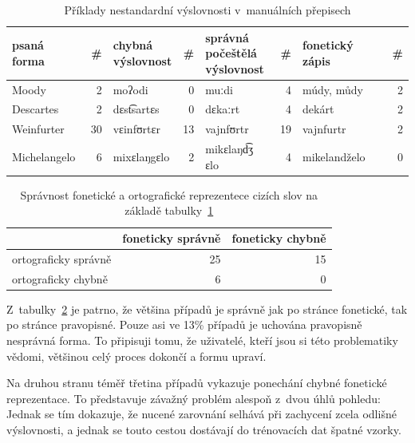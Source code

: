 \begin{table}[htpb]
\begin{center}
\begin{tabular}{|l r|l r|l r|l r|}
\hline
psaná forma                     & \#
    & \makecell{chybná\\ výslovnost} & \#
        & \makecell{správná\\ počeštělá\\ výslovnost}  & \#
            & fonetický zápis               & \# \\
\hline
Moody & 2 & moʔodi & 0 & muːdi & 4 & múdy, můdy & 2 \\
Descartes & 2 & dɛst͡sartɛs  & 0 & dɛkaːrt & 4 & dekárt & 2   \\
Weinfurter & 30 & vɛinfʊrtɛr & 13 & vajnfʊrtr & 19 & vajnfurtr & 2 \\
Michelangelo & 6 & mixɛlaŋgɛlo & 2 & mikɛlaŋd͡ʒ ɛlo  & 4 & mikelandželo & 0 \\
\hline
\end{tabular}
\caption{Příklady nestandardní výslovnosti v~manuálních přepisech}
\label{tab:eval-pronunc}
\end{center}
\end{table}

\begin{table}[htpb]
\begin{center}
\begin{tabular}{|l|r|r|}
\hline
 & foneticky správně & foneticky chybně \\
\hline
ortograficky správně & 25 & 15 \\
\hline
ortograficky chybně & 6 & 0 \\
\hline
\end{tabular}
\caption{Správnost fonetické a ortografické reprezentece cizích slov na základě
tabulky~\ref{tab:eval-pronunc}}
\label{tab:pronunc-rate}
\end{center}
\normalfont
\end{table}

Z~tabulky~\ref{tab:pronunc-rate} je patrno, že většina případů je správně jak
po stránce fonetické, tak po stránce pravopisné. Pouze asi ve 13\% případů je
uchována pravopisně nesprávná forma. To připisuji tomu, že uživatelé, kteří jsou
si této problematiky vědomi, většinou celý proces dokončí a formu upraví.

Na druhou stranu téměř třetina případů vykazuje ponechání chybné fonetické
reprezentace. To představuje závažný problém alespoň z~dvou úhlů pohledu: Jednak
se tím dokazuje, že nucené zarovnání selhává při zachycení zcela odlišné
výslovnosti, a jednak se touto cestou dostávají do trénovacích dat špatné
vzorky.

